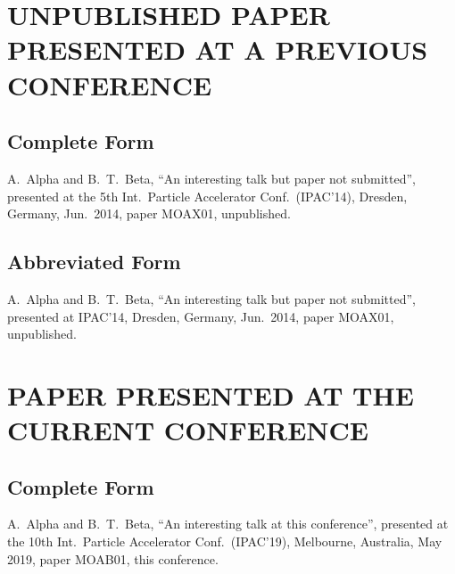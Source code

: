 \section{UNPUBLISHED PAPER PRESENTED AT A PREVIOUS CONFERENCE}

\subsection{Complete Form}

\begin{thebibliography}{9} %
\setcounter{enumi}{3}
	A.~Alpha and B.~T.~Beta,
	“An interesting talk but paper not submitted”,
	presented at the 5th Int.\ Particle Accelerator Conf.\ (IPAC’14),
	Dresden, Germany, Jun.\ 2014, paper MOAX01, unpublished.
\end{thebibliography}

\subsection{Abbreviated Form}

\begin{thebibliography}{9} %
\setcounter{enumi}{3}
	A.~Alpha and B.~T.~Beta,
	“An interesting talk but paper not submitted”,
	presented at IPAC’14,
	Dresden, Germany, Jun.\ 2014, paper MOAX01, unpublished.
\end{thebibliography}


\section{PAPER PRESENTED AT THE CURRENT CONFERENCE}

\subsection{Complete Form}

\begin{thebibliography}{9} %
\setcounter{enumi}{4}
	A.~Alpha and B.~T.~Beta,
	“An interesting talk at this conference”,
	presented at the 10th Int.\ Particle Accelerator
	Conf.\ (IPAC’19), Melbourne, Australia, May 2019, 
	paper MOAB01, this conference.
\end{thebibliography}

